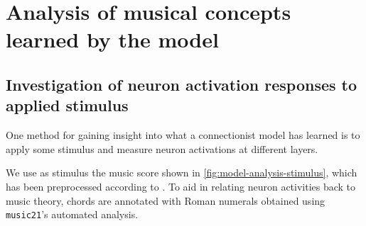 \chapter{Analysis of musical concepts learned by the model}
\ifpdf
    \graphicspath{{Chapter7/Figs/Raster/}{Chapter7/Figs/PDF/}{Chapter7/Figs/}}
\else
    \graphicspath{{Chapter7/Figs/Vector/}{Chapter7/Figs/}}
\fi

\section{Investigation of neuron activation responses to applied stimulus}

One method for gaining insight into what a connectionist model has learned is
to apply some stimulus and measure neuron activations at different layers.

We use as stimulus the music score shown in
\cref{fig:model-analysis-stimulus}, which has been preprocessed according to
. To aid in relating neuron activities back to music
theory, chords are annotated with Roman numerals obtained using {\tt music21}'s
automated analysis.

